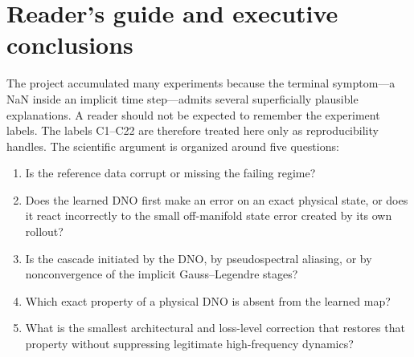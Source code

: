 \documentclass[11pt]{article}
\begin{document}
\section{Reader's guide and executive conclusions}

The project accumulated many experiments because the terminal symptom---a NaN
inside an implicit time step---admits several superficially plausible
explanations.  A reader should not be expected to remember the experiment
labels.  The labels C1--C22 are therefore treated here only as reproducibility
handles.  The scientific argument is organized around five questions:
\begin{enumerate}[label=\arabic*.]
  \item Is the reference data corrupt or missing the failing regime?
  \item Does the learned DNO first make an error on an exact physical state, or
        does it react incorrectly to the small off-manifold state error created
        by its own rollout?
  \item Is the cascade initiated by the DNO, by pseudospectral aliasing, or by
        nonconvergence of the implicit Gauss--Legendre stages?
  \item Which exact property of a physical DNO is absent from the learned map?
  \item What is the smallest architectural and loss-level correction that
        restores that property without suppressing legitimate high-frequency
        dynamics?
\end{enumerate}
\end{document}
